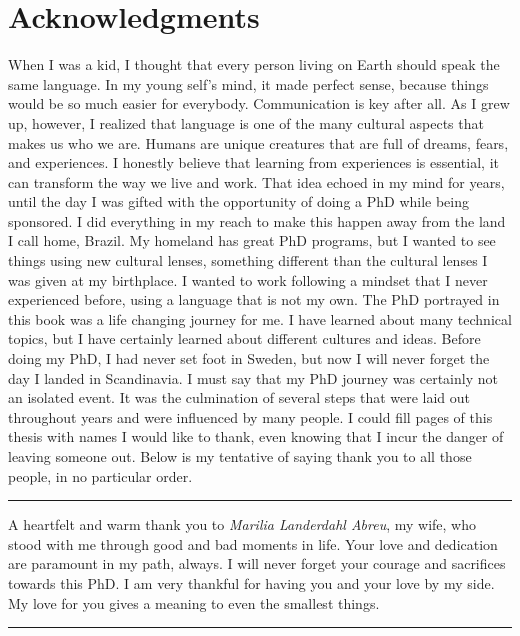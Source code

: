 \chapter*{Acknowledgments}

When I was a kid, I thought that every person living on Earth should speak the same language. In my young self's mind, it made perfect sense, because things would be so much easier for everybody. Communication is key after all. As I grew up, however, I realized that language is one of the many cultural aspects that makes us who we are. Humans are unique creatures that are full of dreams, fears, and experiences. I honestly believe that learning from experiences is essential, it can transform the way we live and work. That idea echoed in my mind for years, until the day I was gifted with the opportunity of doing a PhD while being sponsored. I did everything in my reach to make this happen away from the land I call home, Brazil. My homeland has great PhD programs, but I wanted to see things using new cultural lenses, something different than the cultural lenses I was given at my birthplace. I wanted to work following a mindset that I never experienced before, using a language that is not my own. The PhD portrayed in this book was a life changing journey for me. I have learned about many technical topics, but I have certainly learned about different cultures and ideas. Before doing my PhD, I had never set foot in Sweden, but now I will never forget the day I landed in Scandinavia. I must say that my PhD journey was certainly not an isolated event. It was the culmination of several steps that were laid out throughout years and were influenced by many people. I could fill pages of this thesis with names I would like to thank, even knowing that I incur the danger of leaving someone out. Below is my tentative of saying thank you to all those people, in no particular order.

\vspace{7pt}\hrule\vspace{5pt}

A heartfelt and warm thank you to \textit{Marilia Landerdahl Abreu}, my wife, who stood with me through good and bad moments in life. Your love and dedication are paramount in my path, always. I will never forget your courage and sacrifices towards this PhD. I am very thankful for having you and your love by my side. My love for you gives a meaning to even the smallest things.

\vspace{7pt}\hrule\vspace{5pt}

